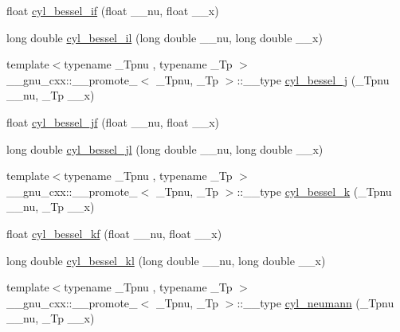 \begin{DoxyCompactItemize}
\item 
float \hyperlink{group__tr29124__math__spec__func_gaaf738427d4da0bda66bc2274dfb853a7}{cyl\+\_\+bessel\+\_\+if} (float \+\_\+\+\_\+nu, float \+\_\+\+\_\+x)
\item 
long double \hyperlink{group__tr29124__math__spec__func_gab7962629216d03efb8ecaa3f70c6878f}{cyl\+\_\+bessel\+\_\+il} (long double \+\_\+\+\_\+nu, long double \+\_\+\+\_\+x)
\item 
{\footnotesize template$<$typename \+\_\+\+Tpnu , typename \+\_\+\+Tp $>$ }\\\+\_\+\+\_\+gnu\+\_\+cxx\+::\+\_\+\+\_\+promote\+\_$<$ \+\_\+\+Tpnu, \+\_\+\+Tp $>$\+::\+\_\+\+\_\+type \hyperlink{group__tr29124__math__spec__func_ga47e21a13b6d68d0d7f057699bd3b3ce0}{cyl\+\_\+bessel\+\_\+j} (\+\_\+\+Tpnu \+\_\+\+\_\+nu, \+\_\+\+Tp \+\_\+\+\_\+x)
\item 
float \hyperlink{group__tr29124__math__spec__func_ga15731a7bccd6351d28353e3c4c2a2d23}{cyl\+\_\+bessel\+\_\+jf} (float \+\_\+\+\_\+nu, float \+\_\+\+\_\+x)
\item 
long double \hyperlink{group__tr29124__math__spec__func_gade8e94a80520a8b628b2d658755b25c0}{cyl\+\_\+bessel\+\_\+jl} (long double \+\_\+\+\_\+nu, long double \+\_\+\+\_\+x)
\item 
{\footnotesize template$<$typename \+\_\+\+Tpnu , typename \+\_\+\+Tp $>$ }\\\+\_\+\+\_\+gnu\+\_\+cxx\+::\+\_\+\+\_\+promote\+\_$<$ \+\_\+\+Tpnu, \+\_\+\+Tp $>$\+::\+\_\+\+\_\+type \hyperlink{group__tr29124__math__spec__func_ga76dcd3884620955680112aca0d327ada}{cyl\+\_\+bessel\+\_\+k} (\+\_\+\+Tpnu \+\_\+\+\_\+nu, \+\_\+\+Tp \+\_\+\+\_\+x)
\item 
float \hyperlink{group__tr29124__math__spec__func_ga1f50047f9aab0ec8b1a1615fe9fbe32f}{cyl\+\_\+bessel\+\_\+kf} (float \+\_\+\+\_\+nu, float \+\_\+\+\_\+x)
\item 
long double \hyperlink{group__tr29124__math__spec__func_gac35194b926270d7857d651e06198c7d3}{cyl\+\_\+bessel\+\_\+kl} (long double \+\_\+\+\_\+nu, long double \+\_\+\+\_\+x)
\item 
{\footnotesize template$<$typename \+\_\+\+Tpnu , typename \+\_\+\+Tp $>$ }\\\+\_\+\+\_\+gnu\+\_\+cxx\+::\+\_\+\+\_\+promote\+\_$<$ \+\_\+\+Tpnu, \+\_\+\+Tp $>$\+::\+\_\+\+\_\+type \hyperlink{group__tr29124__math__spec__func_ga5b7c72ab85e361cbd73f1a3b5f0725a6}{cyl\+\_\+neumann} (\+\_\+\+Tpnu \+\_\+\+\_\+nu, \+\_\+\+Tp \+\_\+\+\_\+x)
\item 

\end{DoxyCompactItemize}
